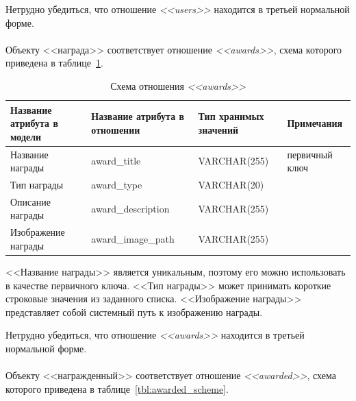 Нетрудно убедиться, что отношение \textit{<<users>>} находится в третьей
нормальной форме.

\paragraph{}
Объекту <<награда>> соответствует отношение \textit{<<awards>>},
схема которого приведена в таблице~\ref{tbl:awards_scheme}.

\begin{table}[h!]
  \caption{Схема отношения \textit{<<awards>>}}
  \label{tbl:awards_scheme}
  \small{
    \centering
    \begin{tabular}{| p{} | p{} | p{} | p{} |}
      \hline
      Название атрибута \newline в модели &
      Название атрибута \newline в отношении &
      Тип хранимых \newline значений &
      Примечания \\ \hline

      Название награды &
      award\_title &
      VARCHAR(255) &
      первичный ключ \\
      \hline

      Тип награды &
      award\_type &
      VARCHAR(20) & \\
      \hline

      Описание награды &
      award\_description &
      VARCHAR(255) & \\
      \hline

      Изображение награды &
      award\_image\_path &
      VARCHAR(255) & \\
      \hline
    \end{tabular}
  }
\end{table}

<<Название награды>> является уникальным, поэтому его можно использовать
в качестве первичного ключа.
<<Тип награды>> может принимать короткие строковые значения
из заданного списка.
<<Изображение награды>> представляет собой системный путь к изображению награды.

Нетрудно убедиться, что отношение \textit{<<awards>>} находится 
в третьей нормальной форме.

\paragraph{}
Объекту <<награжденный>> соответствует отношение \textit{<<awarded>>},
схема которого приведена в таблице~\ref{tbl:awarded_scheme}.

